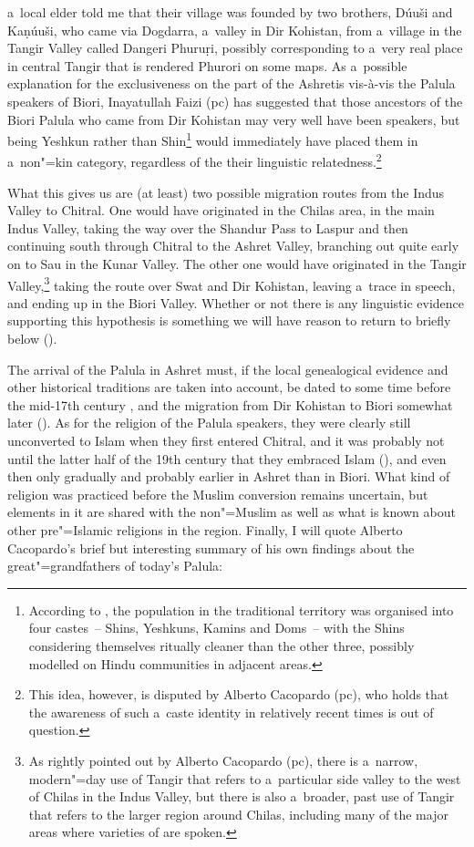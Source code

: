 a~local elder told me that their village was founded by two brothers, Dúuši‌ and ‌Kaṇúuši, who came
via Dogdarra, a~valley in Dir Kohistan, from a~village in the Tangir Valley called Dangeri Phuruṛi,
possibly corresponding to a~very real place in central Tangir that is rendered Phurori on some
maps. As a~possible explanation for the exclusiveness on the part of the Ashretis vis-à-vis the
Palula speakers of Biori, Inayatullah Faizi (pc) has suggested that those ancestors of the Biori
Palula who came from Dir Kohistan may very well have been \iliShina speakers, but being Yeshkun rather
than Shin\footnote{According to \citet[17]{jettmar2002}, the population in the traditional \iliShina
  territory was organised into four castes~-- Shins, Yeshkuns, Kamins and Doms~-- with the Shins
  considering themselves ritually cleaner than the other three, possibly modelled on Hindu
  communities in adjacent areas. } would immediately have placed them in a~non"=kin category,
regardless of the their linguistic relatedness.\footnote{This idea, however, is disputed by Alberto
  Cacopardo (pc), who holds that the awareness of such a~caste identity in relatively recent times
  is out of question.}


What this gives us are (at least) two possible migration routes from the Indus Valley to
Chitral. One would have originated in the Chilas area, in the main Indus Valley, taking the way over
the Shandur Pass to Laspur and then continuing south through Chitral to the Ashret Valley, branching
out quite early on to Sau in the Kunar Valley. The other one would have originated in the Tangir
Valley,\footnote{As rightly pointed out by Alberto Cacopardo (pc), there is a~narrow, modern"=day use
  of Tangir that refers to a~particular side valley to the west of Chilas in the Indus Valley, but
  there is also a~broader, past use of Tangir that refers to the larger region around Chilas,
  including many of the major areas where varieties of \iliShina are spoken.} taking the route over
Swat and Dir Kohistan, leaving a~trace in \iliKalkoti speech, and ending up in the Biori Valley. Whether or
not there is any linguistic evidence supporting this hypothesis is something we will have reason to
return to briefly below ().


The arrival of the Palula in Ashret must, if the local genealogical evidence and other historical
traditions are taken into account, be dated to some time before the mid-17th century \citep[88]{cacopardo2001}, and the migration from Dir Kohistan to Biori somewhat later
(\citeyear[118]{cacopardo2001}). As for the religion of the Palula speakers, they were clearly still
unconverted to Islam when they first entered Chitral, and it was probably not until the latter half
of the 19th century that they embraced Islam (\citeyear[83]{cacopardo2001}), and
even then only gradually and probably earlier in Ashret than in Biori. What kind of religion was
practiced before the Muslim conversion remains uncertain, but elements in it are shared with the
non"=Muslim \iliKalasha as well as what is known about other pre"=Islamic religions in the region. Finally, I will quote Alberto Cacopardo's brief but interesting summary of his own findings about the great"=grandfathers of today's Palula:

